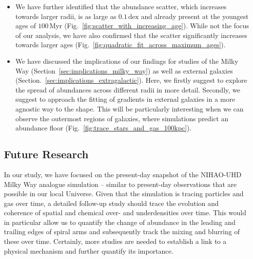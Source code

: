 \documentclass[twocolumn,apj,numberedappendix,appendixfloats]{openjournal}
\begin{document}
\begin{CJK*}{UTF8}{gbsn}
\begin{itemize}
    \item We have further identified that the abundance scatter, which increases towards larger radii, is as large as $0.1\,\mathrm{dex}$ and already present at the youngest ages of $100\,\mathrm{Myr}$ (Fig.~\ref{fig:scatter_with_increasing_age}). While not the focus of our analysis, we have also confirmed that the scatter significantly increases towards larger ages (Fig.~\ref{fig:quadratic_fit_across_maximum_ages}).
    \item We have discussed the implications of our findings for studies of the Milky Way (Section~\ref{sec:implications_milky_way}) as well as external galaxies (Section.~\ref{sec:implications_extragalactic}). Here, we firstly suggest to explore the spread of abundances across different radii in more detail. Secondly, we suggest to approach the fitting of gradients in external galaxies in a more agnostic way to the shape. This will be particularly interesting when we can observe the outermost regions of galaxies, where simulations predict an abundance floor (Fig.~\ref{fig:trace_stars_and_gas_100kpc}).
\end{itemize}

\subsection{Future Research} \label{sec:future_research}

In our study, we have focused on the present-day snapshot of the NIHAO-UHD Milky Way analogue simulation -- similar to present-day observations that are possible in our local Universe. Given that the simulation is tracing particles and gas over time, a detailed follow-up study should trace the evolution and coherence of spatial and chemical over- and underdensities over time. This would in particular allow us to quantify the change of abundance in the leading and trailing edges of spiral arms and subsequently track the mixing and blurring of these over time. Certainly, more studies are needed to establish a link to a physical mechanism and further quantify its importance.


\end{CJK*}
\end{document}
